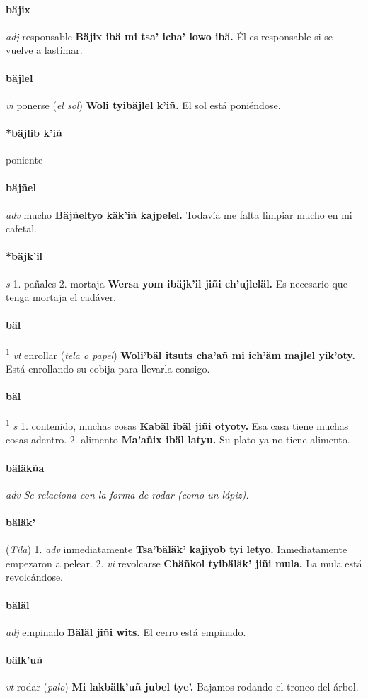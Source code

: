 \documentclass{scrbook}
\newcommand{\entry}[1]{\paragraph{#1}}
\newcommand{\onedefinition}[1]{#1.}
\newcommand{\defsuperscript}[1]{\textsuperscript{1}}
\newcommand{\nontranslationdef}[1]{\textit{#1}}
\newcommand{\partofspeech}[1]{\textit{#1}}
\newcommand{\spanishtranslation}[1]{#1}
\newcommand{\clarification}[1]{(\textit{#1})}
\newcommand{\cholexample}[1]{\textbf{#1}}
\newcommand{\exampletranslation}[1]{#1}
\newcommand{\relevantdialect}[1]{(\textit{#1})}
\begin{document}
\begin{multicols}{2}
\entry{bäjix}
\partofspeech{adj}
\spanishtranslation{responsable}
\cholexample{Bäjix ibä mi tsa' icha' lowo ibä.}
\exampletranslation{Él es responsable si se vuelve a lastimar.}

\entry{bäjlel}
\partofspeech{vi}
\spanishtranslation{ponerse}
\clarification{el sol}
\cholexample{Woli tyibäjlel k'iñ.}
\exampletranslation{El sol está poniéndose.}

\entry{*bäjlib k'iñ}
\spanishtranslation{poniente}

\entry{bäjñel}
\partofspeech{adv}
\spanishtranslation{mucho}
\cholexample{Bäjñeltyo käk'iñ kajpelel.}
\exampletranslation{Todavía me falta limpiar mucho en mi cafetal.}

\entry{*bäjk'il}
\partofspeech{s}
\onedefinition{1}
\spanishtranslation{pañales}
\onedefinition{2}
\spanishtranslation{mortaja}
\cholexample{Wersa yom ibäjk'il jiñi ch'ujleläl.}
\exampletranslation{Es necesario que tenga mortaja el cadáver.}

\entry{bäl}
\defsuperscript{1}
\partofspeech{vt}
\spanishtranslation{enrollar}
\clarification{tela o papel}
\cholexample{Woli'bäl itsuts cha'añ mi ich'äm majlel yik'oty.}
\exampletranslation{Está enrollando su cobija para llevarla consigo.}

\entry{bäl}
\defsuperscript{2}
\partofspeech{s}
\onedefinition{1}
\spanishtranslation{contenido, muchas cosas}
\cholexample{Kabäl ibäl jiñi otyoty.}
\exampletranslation{Esa casa tiene muchas cosas adentro.}
\onedefinition{2}
\spanishtranslation{alimento}
\cholexample{Ma'añix ibäl latyu.}
\exampletranslation{Su plato ya no tiene alimento.}

\entry{bäläkña}
\partofspeech{adv}
\nontranslationdef{Se relaciona con la forma de rodar (como un lápiz).}

\entry{bäläk'}
\relevantdialect{Tila}
\onedefinition{1}
\partofspeech{adv}
\spanishtranslation{inmediatamente}
\cholexample{Tsa'bäläk' kajiyob tyi letyo.}
\exampletranslation{Inmediatamente empezaron a pelear.}
\onedefinition{2}
\partofspeech{vi}
\spanishtranslation{revolcarse}
\cholexample{Chäñkol tyibäläk' jiñi mula.}
\exampletranslation{La mula está revolcándose.}

\entry{bäläl}
\partofspeech{adj}
\spanishtranslation{empinado}
\cholexample{Bäläl jiñi wits.}
\exampletranslation{El cerro está empinado.}

\entry{bälk'uñ}
\partofspeech{vt}
\spanishtranslation{rodar}
\clarification{palo}
\cholexample{Mi lakbälk'uñ jubel tye'.}
\exampletranslation{Bajamos rodando el tronco del árbol.}


\end{multicols}
\end{document}
